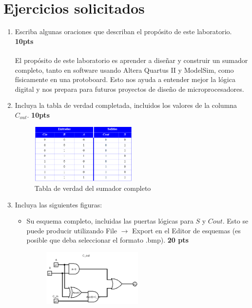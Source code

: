 \documentclass{templateNote}
\begin{document}

\portada
\margenes

\section*{Ejercicios solicitados}

    
\begin{enumerate}
    \item Escriba algunas oraciones que describan el propósito de este laboratorio. \textbf{10pts}
    \\\\ El propósito de este laboratorio es aprender a diseñar y construir un sumador completo, tanto en software usando Altera Quartus II y ModelSim, 
    como físicamente en una protoboard. Esto nos ayuda a entender mejor la lógica digital y nos prepara para futuros proyectos de diseño de microprocesadores.
    \item Incluya la tabla de verdad completada, incluidos los valores de la columna $C_{out}$. \textbf{10pts}
    \begin{figure}[H]
        \centering
        \includegraphics[width=0.5\textwidth]{img/tablaverdad.png}
        \caption{Tabla de verdad del sumador completo}
    \end{figure}
    \item Incluya las siguientes figuras:
    \begin{itemize}
        \item Su esquema completo, incluidas las puertas lógicas para $S$ y $C{out}$. Esto se puede producir utilizando File $\rightarrow$ Export en el Editor de esquemas (es posible que deba seleccionar el formato .bmp). \textbf{20 pts}
        \begin{figure}[H]
            \centering
            \includegraphics[width=0.5\textwidth]{img/c_out.png}

\end{figure}
\end{itemize}
\end{enumerate}
\end{document}

